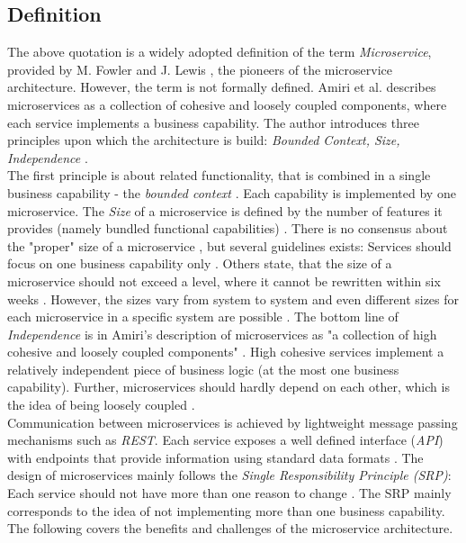 \subsection{Definition}
The above quotation is a widely adopted definition of the term \textit{Microservice}, provided by M. Fowler and J. Lewis \cite{Fowler}, the pioneers of the microservice architecture. However, the term is not formally defined. Amiri et al. describes microservices as a collection of cohesive and loosely coupled components, where each service implements a business capability.
 The author introduces three principles upon which the architecture is build: \textit{Bounded Context, Size, Independence} \cite{ObjectAwareAmiri}. \\
 The first principle is about related functionality, that is combined in a single business capability - the  \textit{bounded context} \cite{FunctionalDecompositionHeinrich}. Each capability is implemented by one microservice. 
The \textit{Size} of a microservice is defined by the number of features it provides (namely bundled functional capabilities)  \cite{WorkloadbasedClustering}. There is no consensus about the "proper" size of a microservice \cite{DomainEngineeringMunezero}, but several guidelines exists: Services should focus on one business capability only \cite{ObjectAwareAmiri}. Others state, that the size of a microservice should not exceed a level, where it cannot be rewritten within six weeks \cite{WorkloadbasedClustering}. However, the sizes vary from system to system \cite{FunctionalDecompositionHeinrich} and even different sizes for each microservice in a specific system are possible \cite{DomainEngineeringMunezero}. The bottom line of \textit{Independence} is in Amiri's description of microservices as "a collection of high cohesive and loosely coupled components" \cite{ObjectAwareAmiri}. High cohesive services implement a relatively independent piece of business logic (at the most one business capability). Further, microservices should hardly depend on each other, which is the idea of being loosely coupled \cite{DataflowDrivenChen}.
\\
Communication between microservices is achieved by lightweight message passing mechanisms such as \textit{REST}. Each service exposes a well defined interface (\textit{API}) with endpoints that provide information using standard data formats \cite{FunctionalDecompositionHeinrich}. 
The design of microservices mainly follows the \textit{Single Responsibility Principle (SRP)}: Each service should not have more than one reason to change \cite{TowardsUnderstandingEvolution}. The SRP mainly corresponds to the idea of not implementing more than one business capability.
The following covers the benefits and challenges of the microservice architecture.


